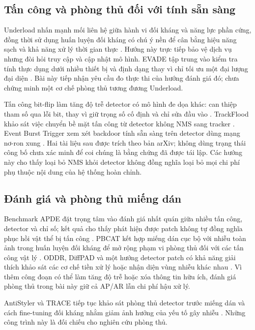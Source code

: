 \documentclass[a4paper,fleqn]{cas-dc}
\newif\ifbranchB
\begin{document}
\subsection{Tấn công và phòng thủ đối với tính sẵn sàng}

Underload nhấn mạnh mối liên hệ giữa hành vi đối kháng và năng lực phần cứng, đồng thời sử dụng huấn luyện đối kháng có chú ý nền để cân bằng hiệu năng sạch và khả năng xử lý thời gian thực \cite{underload2025}. Hướng này trực tiếp bảo vệ dịch vụ nhưng đòi hỏi truy cập và cập nhật mô hình. EVADE tập trung vào kiểm tra tính thực dụng dưới nhiều thiết bị và định dạng thay vì chỉ tối ưu một đại lượng đại diện \cite{evade2025}. Bài này tiếp nhận yêu cầu đo thực thi của hướng đánh giá đó; chưa chứng minh một cơ chế phòng thủ tương đương Underload.

Tấn công bit-flip làm tăng độ trễ detector có mô hình đe dọa khác: can thiệp tham số qua lỗi bit, thay vì giữ trọng số cố định và chỉ sửa đầu vào \cite{bitflip2025}. TrackFlood khảo sát việc chuyển bề mặt tấn công từ detector không NMS sang tracker \cite{trackflood2026}. Event Burst Trigger xem xét backdoor tính sẵn sàng trên detector dùng mạng nơ-ron xung \cite{ebt2026}. Hai tài liệu sau được trích theo bản arXiv; không dùng trạng thái công bố chưa xác minh để coi chúng là bằng chứng đã được tái lập. Các hướng này cho thấy loại bỏ NMS khỏi detector không đồng nghĩa loại bỏ mọi chi phí phụ thuộc nội dung của hệ thống hoàn chỉnh.

\subsection{Đánh giá và phòng thủ miếng dán}

Benchmark APDE đặt trọng tâm vào đánh giá nhất quán giữa nhiều tấn công, detector và chỉ số; kết quả cho thấy phát hiện được patch không tự đồng nghĩa phục hồi vật thể bị tấn công \cite{apde2025}. PBCAT kết hợp miếng dán cục bộ với nhiễu toàn ảnh trong huấn luyện đối kháng để mở rộng phạm vi phòng thủ đối với các tấn công vật lý \cite{pbcat2025}. ODDR, DiffPAD và một hướng detector patch có khả năng giải thích khảo sát các cơ chế tiền xử lý hoặc nhận diện vùng nhiễu khác nhau \cite{oddr2025,diffpad2025,advpatchxai2025}. Vì thêm công đoạn có thể làm tăng độ trễ hoặc xóa thông tin hữu ích, đánh giá phòng thủ trong bài này giữ cả AP/AR lẫn chi phí hậu xử lý.

AntiStyler và TRACE tiếp tục khảo sát phòng thủ detector trước miếng dán và cách fine-tuning đối kháng nhằm giảm ảnh hưởng của yếu tố gây nhiễu \cite{antistyler2026,trace2026}. Những công trình này là đối chiếu cho nghiên cứu phòng thủ. \ifbranchB
Benchmark fine-tuning detector thông thường trong nhánh GPU chưa được xem là huấn luyện đối kháng; không chuyển metric person thành robust accuracy dưới Sponge Patch.
\fi
\end{document}
